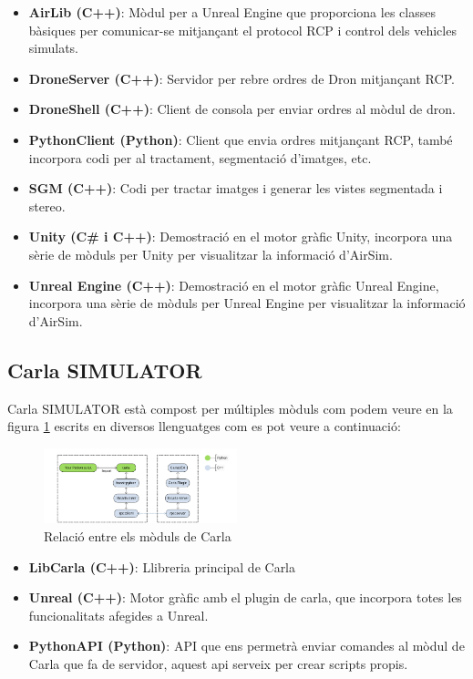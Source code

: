 \documentclass[10pt,a4paper,twocolumn,twoside]{article}
\begin{document}
\begin{itemize}
  \item \textbf{AirLib (C++)}: Mòdul per a Unreal Engine que proporciona les classes bàsiques per comunicar-se mitjançant el protocol RCP i control dels vehicles simulats.
  \item \textbf{DroneServer (C++)}: Servidor per rebre ordres de Dron mitjançant RCP.
  \item \textbf{DroneShell (C++)}: Client de consola per enviar ordres al mòdul de dron.
  \item \textbf{PythonClient (Python)}: Client que envia ordres mitjançant RCP, també incorpora codi per al tractament, segmentació d'imatges, etc.
  \item \textbf{SGM (C++)}: Codi per tractar imatges i generar les vistes segmentada i stereo.
  \item \textbf{Unity (C\# i C++)}: Demostració en el motor gràfic Unity, incorpora una sèrie de mòduls per Unity per visualitzar la informació d'AirSim.
  \item \textbf{Unreal Engine (C++)}: Demostració en el motor gràfic Unreal Engine, incorpora una sèrie de mòduls per Unreal Engine per visualitzar la informació d'AirSim.
\end{itemize}

\subsection{Carla SIMULATOR}

Carla SIMULATOR està compost per múltiples mòduls com podem veure en la figura \ref{fig-carlamodules} escrits en diversos llenguatges com es pot veure a continuació:

\begin{figure}[!h]
\centering
  	\includegraphics[width=0.5\textwidth]{carlamodules}
	\caption{Relació entre els mòduls de Carla}
	\label{fig-carlamodules}
\end{figure}

\begin{itemize}
 \item \textbf{LibCarla (C++)}: Llibreria principal de Carla
 \item \textbf{Unreal (C++)}: Motor gràfic amb el plugin de carla, que incorpora totes les funcionalitats afegides a Unreal.
 \item \textbf{PythonAPI (Python)}: API que ens permetrà enviar comandes al mòdul de Carla que fa de servidor, aquest api serveix per crear scripts propis.
\end{itemize}
\end{document}

